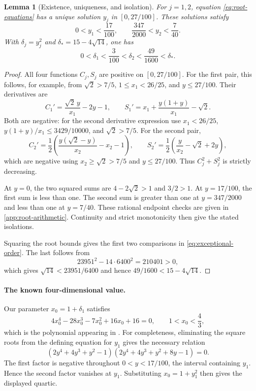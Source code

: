 \documentclass[11pt]{article}
\numberwithin{equation}{section}
\newtheorem{lemma}[lemma]{Lemma}
\theoremstyle{definition}
\theoremstyle{definition}
\begin{document}
\begin{lemma}[Existence, uniqueness, and isolation]
\label{lem:root-isolation}
For $j=1,2$, equation \eqref{eq:root-equations} has a unique solution
$y_j$ in $[0,27/100]$.  These solutions satisfy
\[
 0<y_1<\frac{17}{100},\qquad
 \frac{347}{2000}<y_2<\frac7{40}.
\]
With $\delta_j=y_j^2$ and $\delta_*=15-4\sqrt{14}$, one has
\begin{equation}
 0<\delta_1<\frac{3}{100}<\delta_2<\frac{49}{1600}<\delta_*.
 \label{eq:exceptional-order}
\end{equation}
\end{lemma}
\begin{proof}
All four functions $C_j,S_j$ are positive on $[0,27/100]$.
For the first pair, this follows, for example, from
$\sqrt2>7/5$, $1\le x_1<26/25$, and $y\le27/100$.
Their derivatives are
\[
 C_1'=\frac{\sqrt2\,y}{x_1}-2y-1,
 \qquad
 S_1'=x_1+\frac{y(1+y)}{x_1}-\sqrt2.
\]
Both are negative: for the second derivative expression use
$x_1<26/25$, $y(1+y)/x_1\le3429/10000$, and $\sqrt2>7/5$.
For the second pair,
\[
 C_2'=\frac12\left(\frac{y(\sqrt2-y)}{x_2}-x_2-1\right),
 \qquad
 S_2'=\frac12\left(\frac{y}{x_2}-\sqrt2+2y\right),
\]
which are negative using $x_2\ge\sqrt2>7/5$ and $y\le27/100$.
Thus $C_j^2+S_j^2$ is strictly decreasing.

At $y=0$, the two squared sums are $4-2\sqrt2>1$ and $3/2>1$.
At $y=17/100$, the first sum is less than one. The second sum is
greater than one at $y=347/2000$ and less than one at $y=7/40$.
These rational endpoint checks are given in
\cref{app:root-arithmetic}. Continuity and strict monotonicity
then give the stated isolations.

Squaring the root bounds gives the first two comparisons in
\eqref{eq:exceptional-order}. The last follows from
\[
 23951^2-14\cdot6400^2=210401>0,
\]
which gives $\sqrt{14}<23951/6400$ and hence
$49/1600<15-4\sqrt{14}$.
\end{proof}

\paragraph{The known four-dimensional value.}
Our parameter $x_0=1+\delta_1$ satisfies
\[
 4x_0^4-28x_0^3-7x_0^2+16x_0+16=0,
 \qquad 1<x_0<\frac43,
\]
which is the polynomial appearing in \cite{Shultz2013}.
For completeness, eliminating the square roots from the defining
equation for $y_1$ gives the necessary relation
\[
 (2y^4+4y^3+y^2-1)(2y^4+4y^3+y^2+8y-1)=0.
\]
The first factor is negative throughout $0<y<17/100$, the
interval containing $y_1$. Hence the second factor vanishes
at $y_1$. Substituting $x_0=1+y_1^2$
then gives the displayed quartic.
\end{document}
